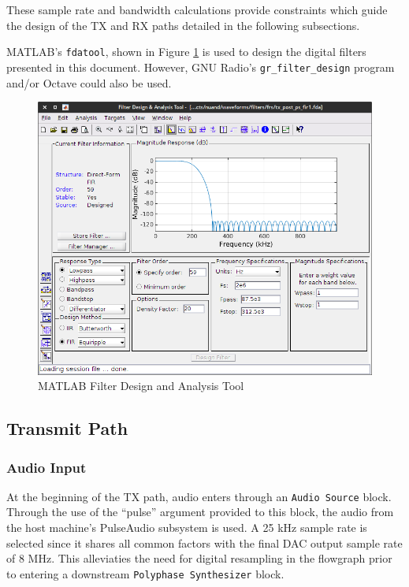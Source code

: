 These sample rate and bandwidth calculations provide constraints which guide
the design of the \ac{TX} and \ac{RX} paths detailed in the following subsections.

MATLAB's \texttt{fdatool}, shown in Figure \ref{fig:fdatool} is used to design
the digital filters presented in this document. However, GNU Radio's
\texttt{gr\_filter\_design} program and/or Octave could also be used.

\begin{figure}[h]
  \centering
  \includegraphics[width=5in]{images/fdatool.png}
  \caption{MATLAB Filter Design and Analysis Tool}
  \label{fig:fdatool}
\end{figure}

\cleardoublepage

\subsection{Transmit Path}

\subsubsection{Audio Input}
At the beginning of the TX path, audio enters through an \texttt{Audio Source}
block. Through the use of the ``pulse'' argument provided to this block, the
audio from the host machine's PulseAudio \cite{PULSE_AUDIO} subsystem is used.
A 25 kHz sample rate is selected
since it shares all common factors with the final DAC output sample  rate of 8 MHz.
This alleviaties the need for digital resampling in the flowgraph prior to entering
a downstream \texttt{Polyphase Synthesizer} block.

